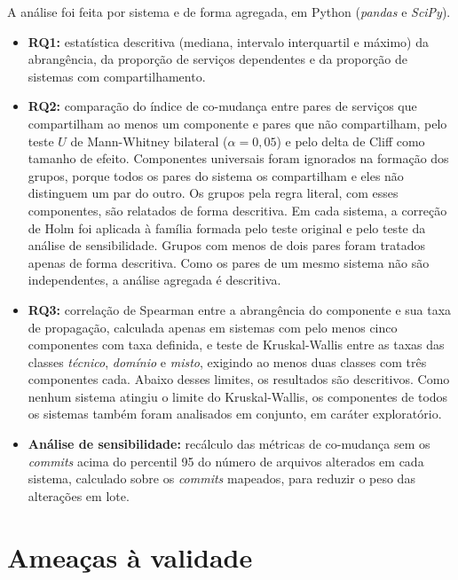 A análise foi feita por sistema e de forma agregada, em Python (\textit{pandas} e \textit{SciPy}).
\begin{itemize}
    \item \textbf{RQ1:} estatística descritiva (mediana, intervalo interquartil e máximo) da abrangência, da proporção de serviços dependentes e da proporção de sistemas com compartilhamento.
    \item \textbf{RQ2:} comparação do índice de co-mudança entre pares de serviços que compartilham ao menos um componente e pares que não compartilham, pelo teste $U$ de Mann-Whitney bilateral ($\alpha = 0{,}05$) e pelo delta de Cliff como tamanho de efeito. Componentes universais foram ignorados na formação dos grupos, porque todos os pares do sistema os compartilham e eles não distinguem um par do outro. Os grupos pela regra literal, com esses componentes, são relatados de forma descritiva. Em cada sistema, a correção de Holm foi aplicada à família formada pelo teste original e pelo teste da análise de sensibilidade. Grupos com menos de dois pares foram tratados apenas de forma descritiva. Como os pares de um mesmo sistema não são independentes, a análise agregada é descritiva.
    \item \textbf{RQ3:} correlação de Spearman entre a abrangência do componente e sua taxa de propagação, calculada apenas em sistemas com pelo menos cinco componentes com taxa definida, e teste de Kruskal-Wallis entre as taxas das classes \textit{técnico}, \textit{domínio} e \textit{misto}, exigindo ao menos duas classes com três componentes cada. Abaixo desses limites, os resultados são descritivos. Como nenhum sistema atingiu o limite do Kruskal-Wallis, os componentes de todos os sistemas também foram analisados em conjunto, em caráter exploratório.
    \item \textbf{Análise de sensibilidade:} recálculo das métricas de co-mudança sem os \textit{commits} acima do percentil 95 do número de arquivos alterados em cada sistema, calculado sobre os \textit{commits} mapeados, para reduzir o peso das alterações em lote.
\end{itemize}

\section{Ameaças à validade}
\label{sec:validade}

